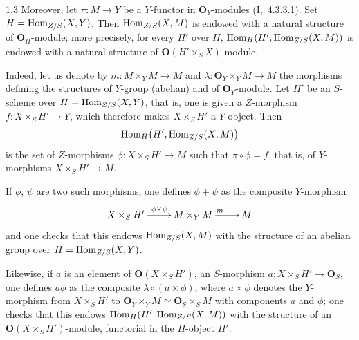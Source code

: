 \begin{remark}{1.3}
\label{II.1.3}
{\renewcommand{\thefootnote}{(4)}}%
Moreover, let \(\pi\colon M\to Y\) be a \(Y\)-functor in
\(\mathbf{O}_Y\)-modules (\cf I,~4.3.3.1). Set
\(H=\operatorname{Hom}_{Z/S}(X,Y)\). Then \(\operatorname{Hom}_{Z/S}(X,M)\) is endowed with a natural
structure of \(\mathbf{O}_H\)-module; more precisely, for every \(H'\) over
\(H\), \(\operatorname{Hom}_H(H',\operatorname{Hom}_{Z/S}(X,M))\) is endowed with a natural structure of
\(\mathbf{O}(H'\times_S X)\)-module.

Indeed, let us denote by \(m\colon M\times_Y M\to M\) and
\(\lambda\colon\mathbf{O}_Y\times_Y M\to M\) the morphisms defining the
structures of \(Y\)-group (abelian) and of \(\mathbf{O}_Y\)-module. Let
\(H'\) be an \(S\)-scheme over \(H=\operatorname{Hom}_{Z/S}(X,Y)\), that is, one is given a
\(Z\)-morphism \(f\colon X\times_S H'\to Y\), which therefore makes
\(X\times_S H'\) a \(Y\)-object. Then
\[
\operatorname{Hom}_H\bigl(H',\operatorname{Hom}_{Z/S}(X,M)\bigr)
\]
is the set of \(Z\)-morphisms \(\phi\colon X\times_S H'\to M\) such that
\(\pi\circ\phi=f\), that is, of \(Y\)-morphisms \(X\times_S H'\to M\).

If \(\phi\), \(\psi\) are two such morphisms, one defines \(\phi+\psi\) as the
composite \(Y\)-morphism
\[
\xymatrix{
X\times_S H' \ar[r]^{\phi\times\psi} & M\times_Y M \ar[r]^{m} & M
}
\]
and one checks that this endows \(\operatorname{Hom}_{Z/S}(X,M)\) with the structure of an
abelian group over \(H=\operatorname{Hom}_{Z/S}(X,Y)\).%
{\renewcommand{\thefootnote}{(5)}}

Likewise, if \(a\) is an element of \(\mathbf{O}(X\times_S H')\), \ie an
\(S\)-morphism \(a\colon X\times_S H'\to\mathbf{O}_S\), one defines \(a\phi\)
as the composite \(\lambda\circ(a\times\phi)\), where \(a\times\phi\) denotes
the \(Y\)-morphism from \(X\times_S H'\) to
\(\mathbf{O}_Y\times_Y M\simeq\mathbf{O}_S\times_S M\) with components \(a\)
and \(\phi\); one checks that this endows
\(\operatorname{Hom}_H(H',\operatorname{Hom}_{Z/S}(X,M))\) with the structure of an
\(\mathbf{O}(X\times_S H')\)-module, functorial in the \(H\)-object \(H'\).
\end{remark}

\label{II.sec.2}

